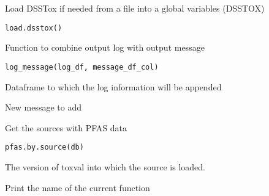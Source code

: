 \documentclass[letterpaper]{book}
\begin{document}
%
\begin{Description}\relax
Load DSSTox if needed from a file into a global variables (DSSTOX)
\end{Description}
%
\begin{Usage}
\begin{verbatim}
load.dsstox()
\end{verbatim}
\end{Usage}
%
\begin{Description}\relax
Function to combine output log with output message
\end{Description}
%
\begin{Usage}
\begin{verbatim}
log_message(log_df, message_df_col)
\end{verbatim}
\end{Usage}
%
\begin{Arguments}
\begin{ldescription}
\item[\code{log\_df}] Dataframe to which the log information will be appended

\item[\code{message\_df\_col}] New message to add
\end{ldescription}
\end{Arguments}
%
\begin{Description}\relax
Get the sources with PFAS data
\end{Description}
%
\begin{Usage}
\begin{verbatim}
pfas.by.source(db)
\end{verbatim}
\end{Usage}
%
\begin{Arguments}
\begin{ldescription}
\item[\code{db}] The version of toxval into which the source is loaded.
\end{ldescription}
\end{Arguments}
%
\begin{Description}\relax
Print the name of the current function
\end{Description}
\end{document}
